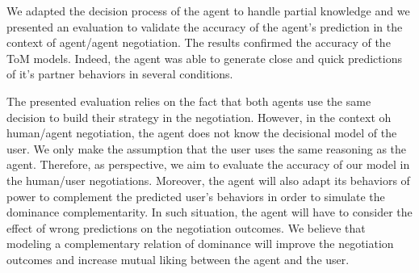 \documentclass[conference, letterpaper]{IEEEtran}
\begin{document}
	We adapted the decision process of the agent to handle partial knowledge and we presented an evaluation to validate the accuracy of the agent's prediction in the context of agent/agent negotiation. The results confirmed the accuracy of the ToM models. Indeed, the agent was able to generate close and quick predictions of it's partner behaviors in several conditions.
	
	The presented evaluation relies on the fact that both agents use the same decision to build their strategy in the negotiation. However, in the context oh human/agent negotiation, the agent does not know the decisional model of the user. We only make the assumption that the user uses the same reasoning as the agent.
	Therefore, as perspective, we aim to evaluate the accuracy of our model in the human/user negotiations. Moreover, the agent will also adapt its behaviors of power to complement the predicted user's behaviors in order to simulate the dominance complementarity. In such situation, the agent will have to consider the effect of wrong predictions on the negotiation outcomes. We believe that modeling a complementary relation of dominance will improve the negotiation outcomes and increase mutual liking between the agent and the user.
	
	
	
	
	
	
	
	
	
\end{document}
